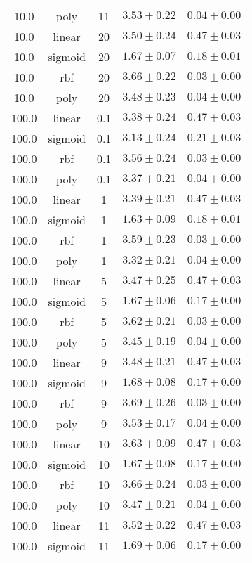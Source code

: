 \begin{tabular}{cccrr}
10.0 & poly & 11 & $3.53 \pm 0.22$ & $0.04 \pm 0.00$\\
10.0 & linear & 20 & $3.50 \pm 0.24$ & $0.47 \pm 0.03$\\
10.0 & sigmoid & 20 & $1.67 \pm 0.07$ & $0.18 \pm 0.01$\\
10.0 & rbf & 20 & $3.66 \pm 0.22$ & $0.03 \pm 0.00$\\
10.0 & poly & 20 & $3.48 \pm 0.23$ & $0.04 \pm 0.00$\\
100.0 & linear & 0.1 & $3.38 \pm 0.24$ & $0.47 \pm 0.03$\\
100.0 & sigmoid & 0.1 & $3.13 \pm 0.24$ & $0.21 \pm 0.03$\\
100.0 & rbf & 0.1 & $3.56 \pm 0.24$ & $0.03 \pm 0.00$\\
100.0 & poly & 0.1 & $3.37 \pm 0.21$ & $0.04 \pm 0.00$\\
100.0 & linear & 1 & $3.39 \pm 0.21$ & $0.47 \pm 0.03$\\
100.0 & sigmoid & 1 & $1.63 \pm 0.09$ & $0.18 \pm 0.01$\\
100.0 & rbf & 1 & $3.59 \pm 0.23$ & $0.03 \pm 0.00$\\
100.0 & poly & 1 & $3.32 \pm 0.21$ & $0.04 \pm 0.00$\\
100.0 & linear & 5 & $3.47 \pm 0.25$ & $0.47 \pm 0.03$\\
100.0 & sigmoid & 5 & $1.67 \pm 0.06$ & $0.17 \pm 0.00$\\
100.0 & rbf & 5 & $3.62 \pm 0.21$ & $0.03 \pm 0.00$\\
100.0 & poly & 5 & $3.45 \pm 0.19$ & $0.04 \pm 0.00$\\
100.0 & linear & 9 & $3.48 \pm 0.21$ & $0.47 \pm 0.03$\\
100.0 & sigmoid & 9 & $1.68 \pm 0.08$ & $0.17 \pm 0.00$\\
100.0 & rbf & 9 & $3.69 \pm 0.26$ & $0.03 \pm 0.00$\\
100.0 & poly & 9 & $3.53 \pm 0.17$ & $0.04 \pm 0.00$\\
100.0 & linear & 10 & $3.63 \pm 0.09$ & $0.47 \pm 0.03$\\
100.0 & sigmoid & 10 & $1.67 \pm 0.08$ & $0.17 \pm 0.00$\\
100.0 & rbf & 10 & $3.66 \pm 0.24$ & $0.03 \pm 0.00$\\
100.0 & poly & 10 & $3.47 \pm 0.21$ & $0.04 \pm 0.00$\\
100.0 & linear & 11 & $3.52 \pm 0.22$ & $0.47 \pm 0.03$\\
100.0 & sigmoid & 11 & $1.69 \pm 0.06$ & $0.17 \pm 0.00$\\

\end{tabular}
